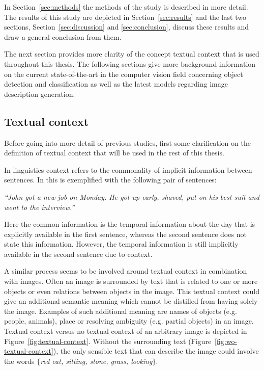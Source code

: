 In Section~\ref{sec:methods} the methods of the study is described in more detail. The results of this study are depicted in Section~\ref{sec:results} and the last two sections, Section~\ref{sec:discussion} and \ref{sec:conclusion}, discuss these results and draw a general conclusion from them.

The next section provides more clarity of the concept textual context that is used throughout this thesis. The following sections give more background information on the current state-of-the-art in the computer vision field concerning object detection and classification as well as the latest models regarding image description generation.


\subsection{Textual context}
\label{sec:textual-context}
Before going into more detail of previous studies, first some clarification on the definition of textual context that will be used in the rest of this thesis.

In linguistics context refers to the commonality of implicit information between sentences. In \cite{Fortu2005} this is exemplified with the following pair of sentences:

\begin{displayquote}
	\emph{``John got a new job on Monday. He got up early, shaved, put on his best suit and went to the interview.''}
\end{displayquote}

\noindent Here the common information is the temporal information about the day that is explicitly available in the first sentence,  whereas the second sentence does not state this information. However, the temporal information is still implicitly available in the second sentence due to context. 

A similar process seems to be involved around textual context in combination with images. Often an image is surrounded by text that is related to one or more objects or even relations between objects in the image. This textual context could give an additional semantic meaning which cannot be distilled from having solely the image. Examples of such additional meaning are names of objects (e.g. people, animals), place or resolving ambiguity (e.g. partial objects) in an image. Textual context versus no textual context of an arbitrary image is depicted in Figure~\ref{fig:textual-context}. Without the surrounding text (Figure~\ref{fig:wo-textual-context}), the only sensible text that can describe the image could involve the words \emph{$\{$red cat, sitting, stone, grass, looking$\}$}. 

